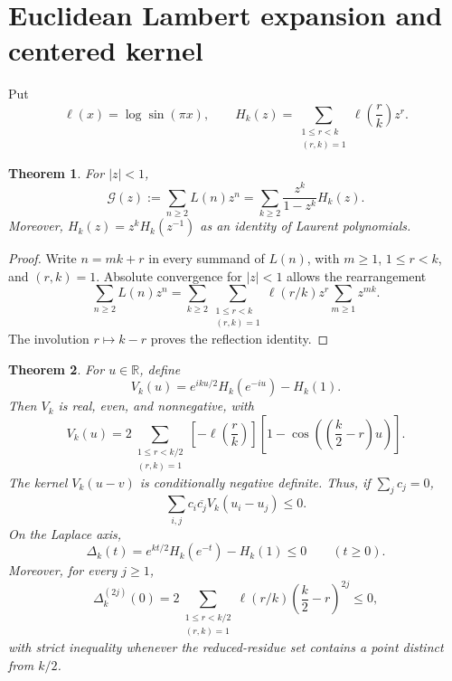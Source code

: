 \documentclass[11pt]{amsart}
\numberwithin{equation}{section}
\newtheorem{theorem}{Theorem}[section]
\theoremstyle{definition}
\theoremstyle{remark}
\newcommand{\R}{\mathbb R}
\begin{document}
\section{Euclidean Lambert expansion and centered kernel}
\label{sec:centered-kernel}

Put
\begin{equation}\label{eq:ell-H}
 \ell(x)=\log\sin(\pi x),
 \qquad
 H_k(z)=\sum_{\substack{1\leq r<k\\(r,k)=1}}
 \ell\!\left(\frac rk\right)z^r.
\end{equation}

\begin{theorem}\label{thm:Lambert}
For \(|z|<1\),
\begin{equation}\label{eq:Lambert}
 \mathcal G(z):=\sum_{n\geq2}L(n)z^n
 =\sum_{k\geq2}\frac{z^k}{1-z^k}H_k(z).
\end{equation}
Moreover, \(H_k(z)=z^kH_k(z^{-1})\) as an identity of Laurent
polynomials.
\end{theorem}

\begin{proof}
Write \(n=mk+r\) in every summand of \(L(n)\), with \(m\geq1\),
\(1\leq r<k\), and \((r,k)=1\).  Absolute convergence for \(|z|<1\)
allows the rearrangement
\[
 \sum_{n\geq2}L(n)z^n
 =\sum_{k\geq2}\sum_{\substack{1\leq r<k\\(r,k)=1}}
 \ell(r/k)z^r\sum_{m\geq1}z^{mk}.
\]
The involution \(r\mapsto k-r\) proves the reflection identity.
\end{proof}

\begin{theorem}\label{thm:centered}
For \(u\in\R\), define
\begin{equation}\label{eq:Vk}
 V_k(u)=e^{iku/2}H_k(e^{-iu})-H_k(1).
\end{equation}
Then \(V_k\) is real, even, and nonnegative, with
\begin{equation}\label{eq:Vk-positive}
 V_k(u)=2\sum_{\substack{1\leq r<k/2\\(r,k)=1}}
 \left[-\ell\!\left(\frac rk\right)\right]
 \left[1-\cos\!\left(\left(\frac k2-r\right)u\right)\right].
\end{equation}
The kernel \(V_k(u-v)\) is conditionally negative definite.  Thus, if
\(\sum_jc_j=0\),
\begin{equation}\label{eq:CND}
 \sum_{i,j}c_i\overline{c_j}V_k(u_i-u_j)\leq0.
\end{equation}
On the Laplace axis,
\begin{equation}\label{eq:Delta}
 \Delta_k(t)=e^{kt/2}H_k(e^{-t})-H_k(1)\leq0
 \qquad(t\geq0).
\end{equation}
Moreover, for every \(j\geq1\),
\begin{equation}\label{eq:Delta-even-derivatives}
 \Delta_k^{(2j)}(0)
 =2\sum_{\substack{1\leq r<k/2\\(r,k)=1}}
 \ell(r/k)\left(\frac k2-r\right)^{2j}\leq0,
\end{equation}
with strict inequality whenever the reduced-residue set contains a point
distinct from \(k/2\).
\end{theorem}
\end{document}
